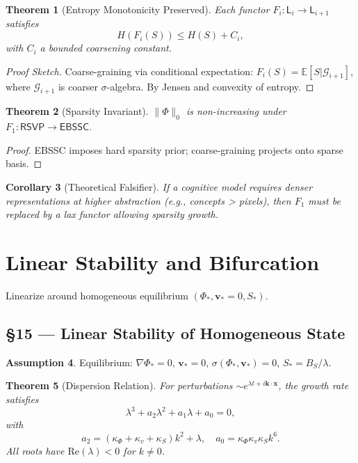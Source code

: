 \documentclass[11pt]{article}
\newtheorem{theorem}{Theorem}[section]
\newtheorem{corollary}[theorem]{Corollary}
\theoremstyle{definition}
\newtheorem{assumption}[theorem]{Assumption}
\theoremstyle{remark}
\newcommand{\vect}[1]{\bm{#1}}
\begin{document}
\begin{theorem}[Entropy Monotonicity Preserved]
Each functor $F_i: \mathsf{L}_i \to \mathsf{L}_{i+1}$ satisfies
\[
H(F_i(S)) \le H(S) + C_i,
\]
with $C_i$ a bounded coarsening constant.
\end{theorem}

\begin{proof}[Proof Sketch]
Coarse-graining via conditional expectation: $F_i(S) = \mathbb{E}[S | \mathcal{G}_{i+1}]$, where $\mathcal{G}_{i+1}$ is coarser $\sigma$-algebra. By Jensen and convexity of entropy.
\end{proof}

\begin{theorem}[Sparsity Invariant]
$\|\Phi\|_0$ is non-increasing under $F_1: \mathsf{RSVP} \to \mathsf{EBSSC}$.
\end{theorem}

\begin{proof}
EBSSC imposes hard sparsity prior; coarse-graining projects onto sparse basis.
\end{proof}

\begin{corollary}[Theoretical Falsifier]
If a cognitive model requires denser representations at higher abstraction (e.g., concepts > pixels), then $F_1$ must be replaced by a \emph{lax} functor allowing sparsity growth.
\end{corollary}

\section{Linear Stability and Bifurcation}
Linearize around homogeneous equilibrium $(\Phi_*,\vect{v}_*=0,S_*)$.

\subsection*{§15 — Linear Stability of Homogeneous State}

\begin{assumption}
\label{ass:linear}
Equilibrium: $\nabla \Phi_* = 0$, $\vect{v}_* = 0$, $\sigma(\Phi_*,\vect{v}_*) = 0$, $S_* = B_S/\lambda$.
\end{assumption}

\begin{theorem}[Dispersion Relation]
For perturbations $\sim e^{\lambda t + i \mathbf{k} \cdot \mathbf{x}}$, the growth rate satisfies
\[
\lambda^3 + a_2 \lambda^2 + a_1 \lambda + a_0 = 0,
\]
with
\[
a_2 = (\kappa_\Phi + \kappa_v + \kappa_S) k^2 + \lambda, \quad a_0 = \kappa_\Phi \kappa_v \kappa_S k^6.
\]
All roots have $\mathrm{Re}(\lambda) < 0$ for $k \ne 0$.
\end{theorem}
\end{document}
